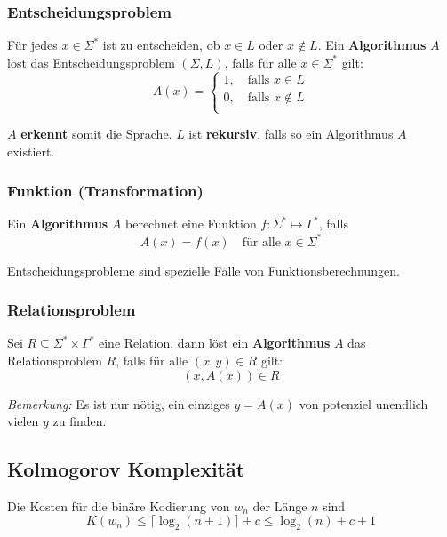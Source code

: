 \documentclass[11pt]{article}
\begin{document}
\subsubsection{Entscheidungsproblem}
F{\"u}r jedes $x \in \Sigma^*$ ist zu entscheiden, ob $x \in L$ oder $x \notin L$. Ein \textbf{Algorithmus} $A$ l{\"o}st das Entscheidungsproblem $(\Sigma, L)$, falls f{\"u}r alle $x \in \Sigma^*$ gilt:
\begin{equation*}
	A(x) = \begin{cases}
		1, \quad\text{falls $x \in L$} \\
		0, \quad\text{falls $x \notin L$} \\
	\end{cases}
\end{equation*}

$A$ \textbf{erkennt} somit die Sprache. $L$ ist \textbf{rekursiv}, falls so ein Algorithmus $A$ existiert.

\subsubsection{Funktion (Transformation)}
Ein \textbf{Algorithmus} $A$ berechnet eine Funktion $f: \Sigma^* \mapsto \Gamma^*$, falls
\begin{equation*}
	A(x) = f(x) \quad\text{f{\"u}r alle $x \in \Sigma^*$}
\end{equation*}

Entscheidungsprobleme sind spezielle F{\"a}lle von Funktionsberechnungen.

\subsubsection{Relationsproblem}
Sei $R \subseteq \Sigma^*\times\Gamma^*$ eine Relation, dann l{\"o}st ein \textbf{Algorithmus} $A$ das Relationsproblem $R$, falls f{\"u}r alle $(x,y) \in R$ gilt:
\begin{equation*}
	(x, A(x)) \in R
\end{equation*}

\emph{Bemerkung:} Es ist nur n{\"o}tig, ein einziges $y = A(x)$ von potenziel unendlich vielen $y$ zu finden.

\subsection{Kolmogorov Komplexit{\"a}t}

Die Kosten f{\"u}r die bin{\"a}re Kodierung von $w_n$ der L{\"a}nge $n$ sind
\begin{equation*}
	K(w_n) \leq \lceil\log_2(n+1)\rceil + c \leq \log_2(n) + c + 1
\end{equation*}
\end{document}
